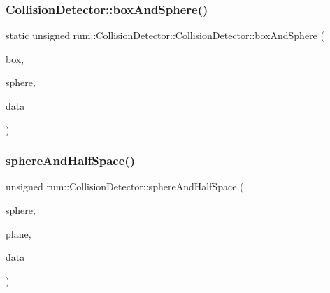 \mbox{\label{classrum_1_1_collision_detector_a33c8f3cf6e8933b8ef8a4d87e7945630}} 
\subsubsection{\texorpdfstring{Collision\+Detector\+::box\+And\+Sphere()}{CollisionDetector::boxAndSphere()}}
{\footnotesize\ttfamily static unsigned rum\+::\+Collision\+Detector\+::\+Collision\+Detector\+::box\+And\+Sphere (\begin{DoxyParamCaption}\item[{const \hyperlink{classrum_1_1_collision_box}{Collision\+Box} \&}]{box,  }\item[{const \hyperlink{classrum_1_1_collision_sphere}{Collision\+Sphere} \&}]{sphere,  }\item[{\hyperlink{classrum_1_1_collision_data}{Collision\+Data} $\ast$}]{data }\end{DoxyParamCaption})\hspace{0.3cm}{\ttfamily [static]}}

\mbox{\label{classrum_1_1_collision_detector_aa8233133673f7ca419ba71099eb32487}} 
\subsubsection{\texorpdfstring{sphere\+And\+Half\+Space()}{sphereAndHalfSpace()}}
{\footnotesize\ttfamily unsigned rum\+::\+Collision\+Detector\+::sphere\+And\+Half\+Space (\begin{DoxyParamCaption}\item[{const \hyperlink{classrum_1_1_collision_sphere}{Collision\+Sphere} \&}]{sphere,  }\item[{const \hyperlink{classrum_1_1_collision_plane}{Collision\+Plane} \&}]{plane,  }\item[{\hyperlink{classrum_1_1_collision_data}{Collision\+Data} $\ast$}]{data }\end{DoxyParamCaption})\hspace{0.3cm}{\ttfamily [static]}}

